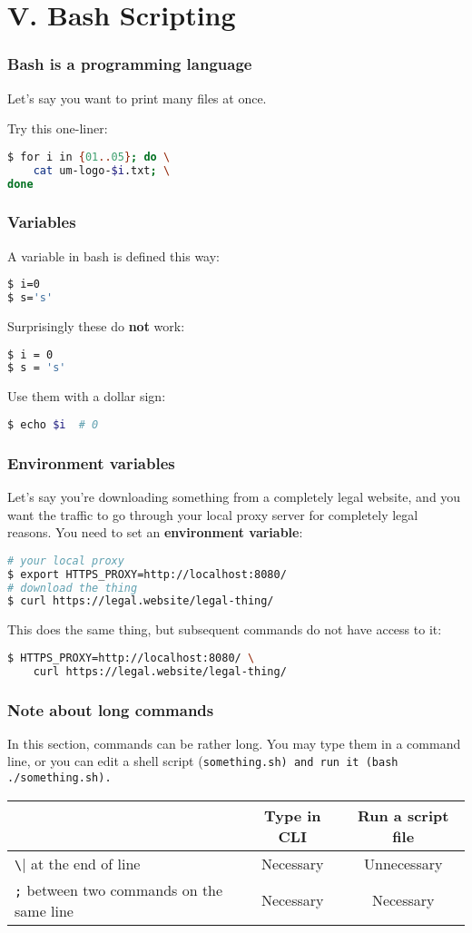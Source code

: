 \section{V. Bash Scripting}
\begin{frame}[fragile]
\frametitle{Bash is a programming language}
Let's say you want to print many files at once.

Try this one-liner:
\begin{lstlisting}[language=bash]
$ for i in {01..05}; do \
    cat um-logo-$i.txt; \
done
\end{lstlisting}
\end{frame}

\begin{frame}[fragile]
\frametitle{Variables}
A variable in bash is defined this way:
\begin{lstlisting}[language=bash]
$ i=0
$ s='s'
\end{lstlisting}
Surprisingly these do \textbf{not} work:
\begin{lstlisting}[language=bash]
$ i = 0
$ s = 's'
\end{lstlisting}
Use them with a dollar sign:
\begin{lstlisting}[language=bash]
$ echo $i  # 0
\end{lstlisting}
\end{frame}

\begin{frame}[fragile]
\frametitle{Environment variables}
Let's say you're downloading something from a completely legal website, and you
want the traffic to go through your local proxy server for completely legal reasons.
You need to set an \textbf{environment variable}:
\begin{lstlisting}[language=bash]
# your local proxy
$ export HTTPS_PROXY=http://localhost:8080/
# download the thing
$ curl https://legal.website/legal-thing/
\end{lstlisting}
This does the same thing, but subsequent commands do not have access to it:
\begin{lstlisting}[language=bash]
$ HTTPS_PROXY=http://localhost:8080/ \
    curl https://legal.website/legal-thing/
\end{lstlisting}
\end{frame}

\begin{frame}[fragile]
\frametitle{Note about long commands}
In this section, commands can be rather long. You may type them in a command line,
or you can edit a shell script (\tt{something.sh}) and run it
(\tt{bash ./something.sh}).
\begin{table}
    \begin{tabular}{m{12em} cc}
        \hline
        & Type in CLI & Run a script file \\
        \hline
        \verb|\| at the end of line & Necessary & Unnecessary \\
        \verb|;| between two commands on the same line & Necessary & Necessary \\
        \hline
    \end{tabular}
\end{table}
\end{frame}

